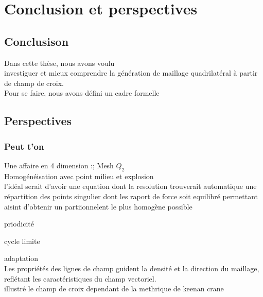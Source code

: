 \chapter{Conclusion et perspectives}
\label{chap:conclusion}

\section*{Conclusison}

Dans cette thèse, nous avons voulu\\
investiguer et mieux comprendre la génération de maillage quadrilatéral à partir de champ de croix.\\
Pour se faire, nous avons défini un cadre formelle



\section*{Perspectives}



\subsection{Peut t'on}

Une affaire en 4 dimension
:;
Mesh $Q_2$\\
\[\]
Homogénéisation avec point milieu et explosion\\
l'idéal serait d'avoir une equation dont la resolution trouverait automatique une répartition des points singulier dont les raport de force soit equilibré permettant aisint d'obtenir un partiionnelent le plus homogène possible
\[\]

priodicité

cycle limite\\
\[\]

adaptation\\
       Les propriétés des lignes de champ guident la densité et la direction du maillage, reflétant les caractéristiques du champ vectoriel.\\
       illustré le champ de croix dependant de la methrique de keenan crane
\[\]
